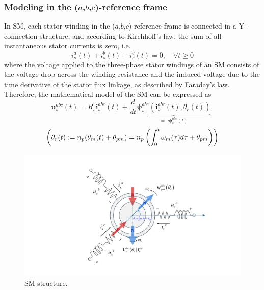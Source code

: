 \subsubsection{Modeling in the ($a$,$b$,$c$)-reference frame}
In SM, each stator winding in the ($a$,$b$,$c$)-reference frame is connected in a Y-connection structure, and according to Kirchhoff's law, the sum of all instantaneous stator currents is zero, i.e. 
\begin{equation}\label{eqn:2.1}
i^a_s(t)+i^b_s(t)+i^c_s(t)=0, \quad \forall t \geq 0    
\end{equation}
where the voltage applied to the three-phase stator windings of an SM consists of the voltage drop across the winding resistance and the induced voltage due to the time derivative of the stator flux linkage, as described by Faraday’s law. Therefore, the mathematical model of the SM can be expressed as
\begin{equation}\label{eqn:2.2}
\mathbf{u}^{abc}_s(t) = R_s \mathbf{i}^{abc}_s(t) + \frac{d}{dt}\underbrace{\bm{\psi}^{abc}_s \left( \mathbf{i}^{abc}_s(t),\theta_r(t)\right)}_{=:\bm{\psi}^{abc}_s(t)},
\end{equation}
\begin{equation}\notag
\left(
    \theta_r(t) := n_p(\theta_m(t) + \theta_{pm})=n_p\left( \int_0^t \omega_m(\tau)d\tau + \theta_{pm}\right)
    \right)
\end{equation}
\begin{figure}[t]
    \centering
    \includegraphics[scale=0.52]{chapters/Fig2.1.pdf}
    \caption{SM structure.}
    \label{Fig:2.1}
\end{figure}
